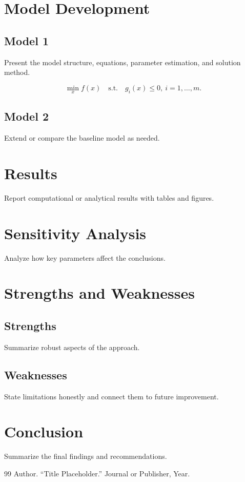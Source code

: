 \documentclass{mcmthesis}
\newif\ifuserefbib
\begin{document}
\section{Model Development}
\subsection{Model 1}
Present the model structure, equations, parameter estimation, and solution method.

\begin{equation}
  \min_x f(x) \quad \text{s.t.} \quad g_i(x) \le 0,\ i=1,\dots,m.
\end{equation}

\subsection{Model 2}
Extend or compare the baseline model as needed.

\section{Results}
Report computational or analytical results with tables and figures.

\section{Sensitivity Analysis}
Analyze how key parameters affect the conclusions.

\section{Strengths and Weaknesses}
\subsection{Strengths}
Summarize robust aspects of the approach.

\subsection{Weaknesses}
State limitations honestly and connect them to future improvement.

\section{Conclusion}
Summarize the final findings and recommendations.

\ifuserefbib
\nocite{placeholder-ref}


\else
\begin{thebibliography}{99}
 Author. ``Title Placeholder.'' Journal or Publisher, Year.
\end{thebibliography}
\fi
\end{document}
